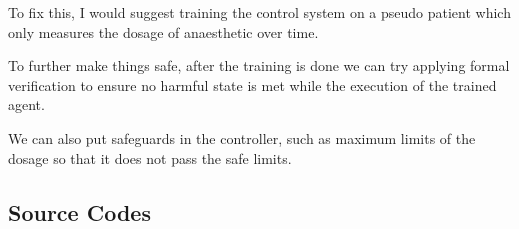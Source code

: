 \documentclass[a4paper,12pt]{article}
\begin{document}
To fix this, I would suggest training the control system on a pseudo patient which only measures the dosage of anaesthetic over time. 

To further make things safe, after the training is done we can try applying formal verification to ensure no harmful state is met while the execution of the trained agent. 

We can also put safeguards in the controller, such as maximum limits of the dosage so that it does not pass the safe limits. 

\pagebreak
\begin{appendices}
\section{Source Codes}
    
\end{appendices}
\end{document}
